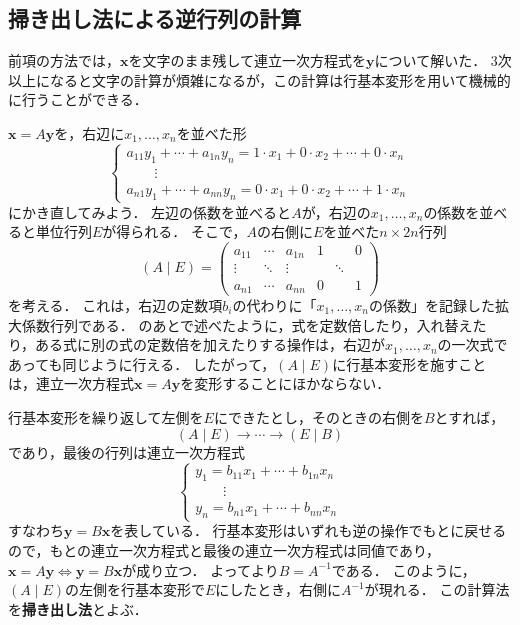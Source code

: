 \subsection{掃き出し法による逆行列の計算}

前項の方法では，$\bm{x}$を文字のまま残して連立一次方程式を$\bm{y}$について解いた．
$3$次以上になると文字の計算が煩雑になるが，この計算は行基本変形を用いて機械的に行うことができる．

$\bm{x} = A\bm{y}$を，右辺に$x_1, \dots, x_n$を並べた形
\[
  \begin{cases}
    a_{11}y_1 + \cdots + a_{1n}y_n = 1 \cdot x_1 + 0 \cdot x_2 + \cdots + 0 \cdot x_n \\
    \hspace{2em} \vdots \\
    a_{n1}y_1 + \cdots + a_{nn}y_n = 0 \cdot x_1 + 0 \cdot x_2 + \cdots + 1 \cdot x_n
  \end{cases}
\]
にかき直してみよう．
左辺の係数を並べると$A$が，右辺の$x_1, \dots, x_n$の係数を並べると単位行列$E$が得られる．
そこで，$A$の右側に$E$を並べた$n \times 2n$行列
\[
  (A \mid E) =
  \left(
  \begin{array}{ccc|ccc}
    a_{11} & \cdots & a_{1n} & 1      &        & 0 \\
    \vdots & \ddots & \vdots &        & \ddots &   \\
    a_{n1} & \cdots & a_{nn} & 0      &        & 1
  \end{array}
  \right)
\]
を考える．
これは，右辺の定数項$b_i$の代わりに「$x_1, \dots, x_n$の係数」を記録した拡大係数行列である．
のあとで述べたように，式を定数倍したり，入れ替えたり，ある式に別の式の定数倍を加えたりする操作は，右辺が$x_1, \dots, x_n$の一次式であっても同じように行える．
したがって，$(A \mid E)$に行基本変形を施すことは，連立一次方程式$\bm{x} = A\bm{y}$を変形することにほかならない．

行基本変形を繰り返して左側を$E$にできたとし，そのときの右側を$B$とすれば，
\[
  (A \mid E) \longrightarrow \cdots \longrightarrow (E \mid B)
\]
であり，最後の行列は連立一次方程式
\[
  \begin{cases}
    y_1 = b_{11}x_1 + \cdots + b_{1n}x_n \\
    \hspace{2em} \vdots \\
    y_n = b_{n1}x_1 + \cdots + b_{nn}x_n
  \end{cases}
\]
すなわち$\bm{y} = B\bm{x}$を表している．
行基本変形はいずれも逆の操作でもとに戻せるので，もとの連立一次方程式と最後の連立一次方程式は同値であり，$\bm{x} = A\bm{y} \iff \bm{y} = B\bm{x}$が成り立つ．
よってより$B = A^{-1}$である．
このように，$(A \mid E)$の左側を行基本変形で$E$にしたとき，右側に$A^{-1}$が現れる．
この計算法を\textbf{掃き出し法}とよぶ．

